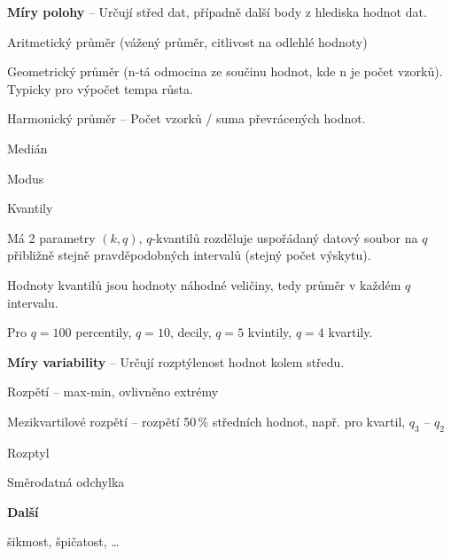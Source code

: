 \begin{compactitem}
    \item \textbf{Míry polohy} -- Určují střed dat, případně další body z hlediska hodnot dat. \begin{compactitem}
        \item Aritmetický průměr (vážený průměr, citlivost na odlehlé hodnoty)

        \item Geometrický průměr (n-tá odmocina ze součinu hodnot, kde n je počet vzorků). Typicky pro výpočet tempa růsta.

        \item Harmonický průměr -- Počet vzorků / suma převrácených hodnot.

        \item Medián

        \item Modus

        \item Kvantily \begin{compactitem}
            \item Má 2 parametry $(k, q)$, $q$-kvantilů rozděluje uspořádaný datový soubor na $q$ přibližně stejně pravděpodobných intervalů (stejný počet výskytu).
            \item Hodnoty kvantilů jsou hodnoty náhodné veličiny, tedy průměr v každém $q$ intervalu.
            \item Pro $q = 100$ percentily, $q = 10$, decily, $q = 5$ kvintily, $q = 4$ kvartily.
        \end{compactitem}
    \end{compactitem}

    \item \textbf{Míry variability} -- Určují rozptýlenost hodnot kolem středu. \begin{compactitem}
        \item Rozpětí -- max-min, ovlivněno extrémy
        \item Mezikvartilové rozpětí -- rozpětí 50\,\% středních hodnot, např. pro kvartil, $q_3$ -- $q_2$
        \item Rozptyl
        \item Směrodatná odchylka
    \end{compactitem}

    \item \textbf{Další} \begin{compactitem}
        \item šikmost, špičatost, \dots
    \end{compactitem}

\end{compactitem}

